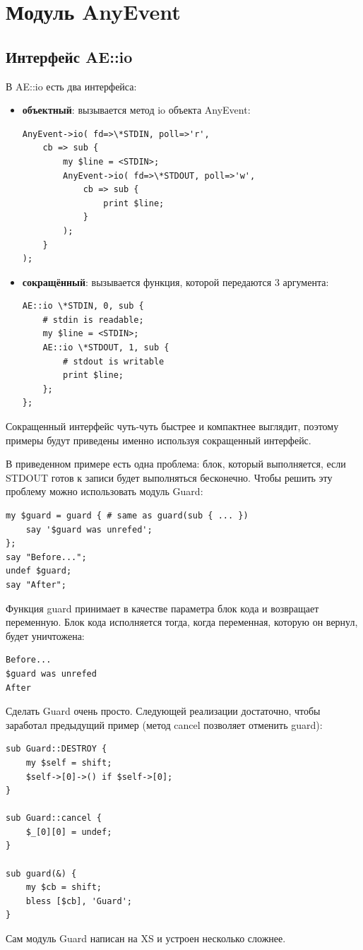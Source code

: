 \section{Модуль AnyEvent}
\subsection{Интерфейс AE::io}%
В AE::io есть два интерфейса:
\begin{itemize}
\item \textbf{объектный}: вызывается метод io объекта AnyEvent:
\begin{verbatim}
AnyEvent->io( fd=>\*STDIN, poll=>'r',
    cb => sub {
        my $line = <STDIN>;
        AnyEvent->io( fd=>\*STDOUT, poll=>'w',
            cb => sub {
                print $line;
            }
        );
    }
);
\end{verbatim}
\item \textbf{сокращённый}: вызывается функция, которой передаются 3 аргумента:
\begin{verbatim}
AE::io \*STDIN, 0, sub {
    # stdin is readable;
    my $line = <STDIN>;
    AE::io \*STDOUT, 1, sub {
        # stdout is writable
        print $line;
    };
};
\end{verbatim}
\end{itemize}
Сокращенный интерфейс чуть-чуть быстрее и компактнее выглядит, поэтому примеры будут приведены именно используя сокращенный интерфейс.

В приведенном примере есть одна проблема: блок, который выполняется, если STDOUT готов к записи будет выполняться бесконечно. Чтобы решить эту проблему можно использовать модуль Guard:
\begin{verbatim}
my $guard = guard { # same as guard(sub { ... })
    say '$guard was unrefed';
};
say "Before...";
undef $guard;
say "After";
\end{verbatim}
Функция guard принимает в качестве параметра блок кода и возвращает переменную. Блок кода исполняется тогда, когда переменная, которую он вернул, будет уничтожена:
\begin{verbatim}
Before...
$guard was unrefed
After
\end{verbatim}
Сделать Guard очень просто. Следующей реализации достаточно, чтобы заработал предыдущий пример (метод cancel позволяет отменить guard):
\begin{verbatim}
sub Guard::DESTROY {
    my $self = shift;
    $self->[0]->() if $self->[0];
}

sub Guard::cancel {
    $_[0][0] = undef;
}

sub guard(&) {
    my $cb = shift;
    bless [$cb], 'Guard';
}
\end{verbatim}
Сам модуль Guard написан на XS и устроен несколько сложнее.


